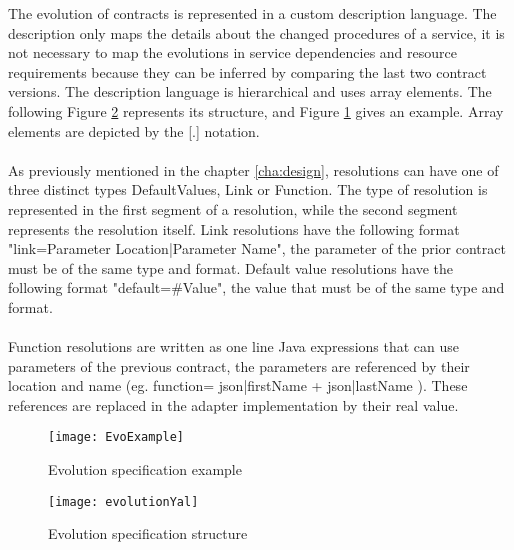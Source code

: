 The evolution of contracts is represented in a custom description language.
The description only maps the details about the changed procedures of a service,
it is not necessary to map the evolutions in service dependencies and resource requirements because they can be inferred by comparing the last two contract versions.
The description language is hierarchical and uses array elements.
The following Figure \ref{fig:evolution_yal} represents its structure, and Figure \ref{fig:evolution_example} gives an example.
Array elements are depicted by the [.] notation.

\paragraph{}

As previously mentioned in the chapter \ref{cha:design}, resolutions can have one of three distinct types {\selectfont  DefaultValues, Link or Function}.
The type of resolution is represented in the first segment of a resolution, while the second segment represents the resolution itself.
Link resolutions have the following format "link={Parameter Location}|{Parameter Name}", the parameter of the prior contract must be of the same type and format.
Default value resolutions have the following format "default=#Value", the value that must be of the same type and format.

\paragraph{}

Function resolutions are written as one line Java expressions that can use parameters of the previous contract, the
parameters are referenced by their location and name (eg. function= {{json|firstName}} + {{json|lastName}} ).
These references are replaced in the adapter implementation by their real value.

\begin{figure}[htbp]
    \centering
    \texttt{[image: EvoExample]}
    \caption{Evolution specification example}
    \label{fig:evolution_example}
\end{figure}

\begin{figure}[htbp]
    \centering
    \texttt{[image: evolutionYal]}
    \caption{Evolution specification structure}
    \label{fig:evolution_yal}
\end{figure}

